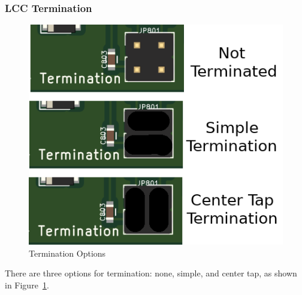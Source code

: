 \subsubsection{LCC Termination}
\label{sect:termination}
\begin{figure}[hbpt]\begin{centering}%
\includegraphics{TerminationJumpers.png}
\caption{Termination Options}
\label{fig:termination}
\end{centering}\end{figure}

There are three options for termination: none, simple, and center tap, as 
shown in Figure~\ref{fig:termination}.



